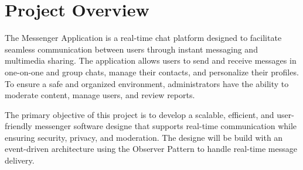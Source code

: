 \chapter{Project Overview}\label{section:introduction}
\thispagestyle{pagestyle}


The Messenger Application is a real-time chat platform designed to facilitate seamless communication between users through instant messaging and multimedia sharing. The application allows users to send and receive messages in one-on-one and group chats, manage their contacts, and personalize their profiles. To ensure a safe and organized environment, administrators have the ability to moderate content, manage users, and review reports.


The primary objective of this project is to develop a scalable, efficient, and user-friendly messenger software designe that supports real-time communication while ensuring security, privacy, and moderation. The designe will be build with an event-driven architecture using the Observer Pattern to handle real-time message delivery.